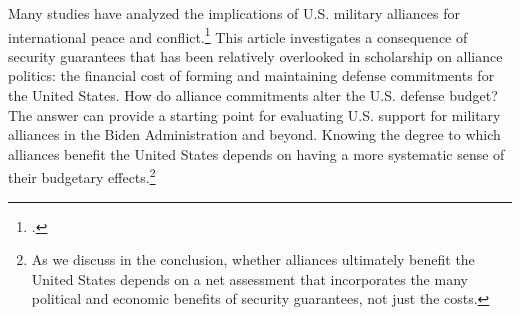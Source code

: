 
Many studies have analyzed the implications of U.S. military alliances for international peace and conflict.\footcite[Much of this work includes, but is not limited to, U.S. alliance commitments. See, for example,][]{leedsAJPS03,FuhrmannSechser2014,aveyJGSS18,mcmanusJOP18} This article investigates a consequence of security guarantees that has been relatively overlooked in scholarship on alliance politics: the financial cost of forming and maintaining defense commitments for the United States. How do alliance commitments alter the U.S. defense budget? The answer can provide a starting point for evaluating U.S. support for military alliances in the Biden Administration and beyond. Knowing the degree to which alliances benefit the United States depends on having a more systematic sense of their budgetary effects.\footnote{As we discuss in the conclusion, whether alliances ultimately benefit the United States depends on a net assessment that incorporates the many political and economic benefits of security guarantees, not just the costs.}

